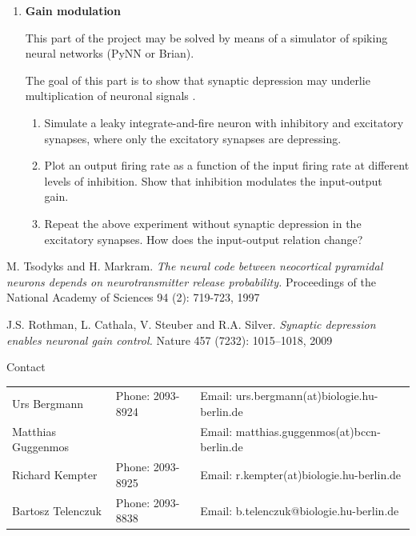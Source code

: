\documentclass[12pt]{article}
\begin{document}
\begin{enumerate}
    \item \textbf{Gain modulation}

        This part of the project may be solved by means of a simulator of
        spiking neural networks (PyNN or Brian).

The goal of this part is to show that synaptic depression may
underlie multiplication of neuronal signals \citep{Rothman09}.

\begin{enumerate}
\item Simulate a leaky integrate-and-fire neuron with inhibitory and
    excitatory synapses, where only the excitatory synapses are
    depressing.

\item Plot an output firing rate as a function of the input firing
    rate at different levels of inhibition. Show that inhibition
    modulates the input-output gain.

\item Repeat the above experiment without synaptic depression in the
    excitatory synapses. How
    does the input-output relation change?
\end{enumerate}


\end{enumerate}


\begin{thebibliography}{9}

      M. Tsodyks and H. Markram. \emph{The neural code between neocortical
      pyramidal neurons depends on neurotransmitter release
      probability.} Proceedings of the National Academy of Sciences
      94 (2): 719-723, 1997

       J.S. Rothman, L. Cathala, V. Steuber  and R.A. Silver.
       \emph{Synaptic depression enables neuronal gain control.} Nature
       457 (7232): 1015--1018, 2009
      \end{thebibliography}


\vfill
\centerline{\CAP Contact} \CAP

\begin{tabular}{lll}
Urs Bergmann & Phone: 2093-8924 & Email:
urs.bergmann(at)biologie.hu-berlin.de \\
Matthias Guggenmos & & Email: matthias.guggenmos(at)bccn-berlin.de \\
Richard Kempter \hfill & Phone: 2093-8925 \hfill & Email:
r.kempter(at)biologie.hu-berlin.de \\
Bartosz Telenczuk & Phone: 2093-8838 &
Email: b.telenczuk@biologie.hu-berlin.de \\
\end{tabular}
\end{document}
